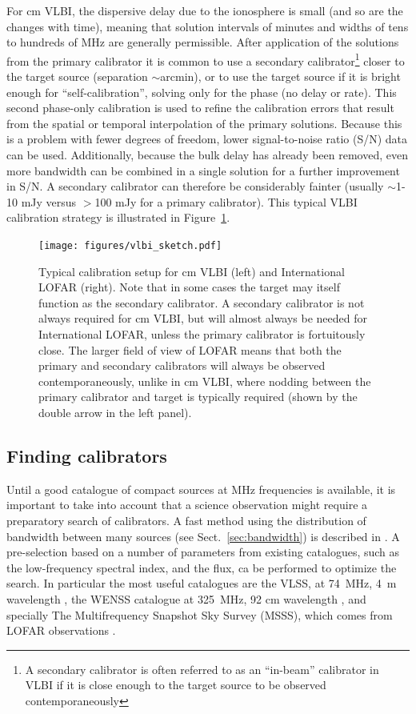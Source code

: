 \documentclass[graybox]{svmult}
\begin{document}
For cm VLBI, the dispersive delay due to the ionosphere is small (and so are
the changes with time), meaning that solution intervals of minutes and widths
of tens to hundreds of MHz are generally permissible.  After application of the
solutions from the primary calibrator it is common to use a secondary
calibrator\footnote{A secondary calibrator is often referred to as an
``in-beam'' calibrator in VLBI if it is close enough to the target source to be
observed contemporaneously} closer to the target source (separation
$\sim$arcmin), or to use the target source if it is bright enough for
``self-calibration'', solving only for the phase (no delay or rate). This
second phase-only calibration is used to refine the calibration errors that
result from the spatial or temporal interpolation of the primary solutions.
Because this is a problem with fewer degrees of freedom, lower signal-to-noise
ratio (S/N) data can be used.  Additionally, because the bulk delay has already
been removed, even more bandwidth can be combined in a single solution for a
further improvement in S/N.  A secondary calibrator can therefore be
considerably fainter (usually $\sim$1-10 mJy versus $>$100 mJy for a primary
calibrator).  This typical VLBI calibration strategy is illustrated in
Figure~\ref{fig:calstrategy}.

\begin{figure}[] %
\center
\texttt{[image: figures/vlbi\_sketch.pdf]}
\caption{Typical calibration setup for cm VLBI (left) and International LOFAR
(right).  Note that in some cases the target may itself function as the
secondary calibrator.  A secondary calibrator is not always required for cm
VLBI, but will almost always be needed for International LOFAR, unless the
primary calibrator is fortuitously close.  The larger field of view of LOFAR
means that both the primary and secondary calibrators will always be observed
contemporaneously, unlike in cm VLBI, where nodding between the primary
calibrator and target is typically required (shown by the double arrow in the
left panel).}
\label{fig:calstrategy}
\end{figure}

\subsection{Finding calibrators}\label{findcalib}

Until a good catalogue of compact sources at MHz frequencies is available, it
is important to take into account that a science observation might require a
preparatory search of calibrators. A fast method using the distribution of
bandwidth between many sources (see Sect.~\ref{sec:bandwidth}) is described in
\cite{moldon15}. A pre-selection based on a number of parameters from existing
catalogues, such as the low-frequency spectral index, and the flux, ca be
performed to optimize the search. In particular the most useful catalogues are
the VLSS, at 74~MHz, 4~m wavelength \citep{lane12a}, the WENSS catalogue at
325~MHz, 92 cm wavelength \citep{rengelink97}, and specially The Multifrequency
Snapshot Sky Survey (MSSS), which comes from LOFAR observations
\citep{heald14}. 
\end{document}
